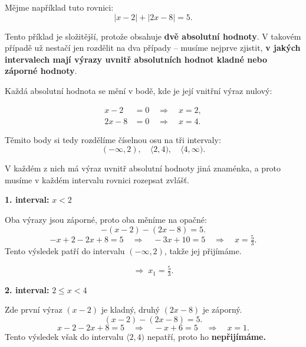 \documentclass[12pt,a4paper]{article}
\begin{document}
Mějme například tuto rovnici:
\[
|x - 2| + |2x - 8| = 5.
\]

Tento příklad je složitější, protože obsahuje \textbf{dvě absolutní hodnoty}.  
V takovém případě už nestačí jen rozdělit na dva případy –  
musíme nejprve zjistit, \textbf{v jakých intervalech mají výrazy uvnitř absolutních hodnot kladné nebo záporné hodnoty}.  

\medskip
Každá absolutní hodnota se mění v bodě, kde je její vnitřní výraz nulový:

\[
\begin{aligned}
x - 2 &= 0 \quad \Rightarrow \quad x = 2,\\
2x - 8 &= 0 \quad \Rightarrow \quad x = 4.
\end{aligned}
\]

Těmito body si tedy rozdělíme číselnou osu na tři intervaly:
\[
(-\infty, 2), \quad \langle 2, 4), \quad \langle 4, \infty).
\]

V každém z nich má výraz uvnitř absolutní hodnoty jiná znaménka,  
a proto musíme v každém intervalu rovnici rozepsat zvlášť.

\begin{center}
\end{center}

\textbf{1. interval:} \(x < 2\)

Oba výrazy jsou záporné, proto oba měníme na opačné:
\[
-(x - 2) - (2x - 8) = 5.
\]
\[
-x + 2 - 2x + 8 = 5 \quad \Rightarrow \quad -3x + 10 = 5 \quad \Rightarrow \quad x = \tfrac{5}{3}.
\]
Tento výsledek patří do intervalu \((- \infty, 2)\), takže jej přijímáme.

\[
\Rightarrow \; x_1 = \tfrac{5}{3}.
\]

\medskip
\textbf{2. interval:} \(2 \le x < 4\)

Zde první výraz \((x - 2)\) je kladný, druhý \((2x - 8)\) je záporný.
\[
(x - 2) - (2x - 8) = 5.
\]
\[
x - 2 - 2x + 8 = 5 \quad \Rightarrow \quad -x + 6 = 5 \quad \Rightarrow \quad x = 1.
\]
Tento výsledek však do intervalu \(\langle 2, 4)\) nepatří, proto ho \textbf{nepřijímáme.}
\end{document}
